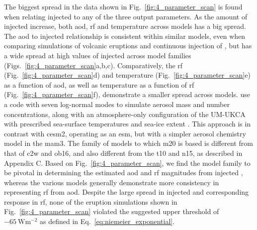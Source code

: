\documentclass{ametsocV6.1}
\newcommand{\iso}[1][i]{{#1}njected \ce{SO2}}
\begin{document}
The biggest spread in the data shown in Fig.~\ref{fig:4_parameter_scan} is found when
relating \iso{} to any of the three output parameters. As the amount of \iso{} increase,
both \gls{aod}, \gls{rf} and temperature across models has a big spread. The \gls{aod}
to \iso{} relationship is consistent within similar models, even when comparing
simulations of volcanic eruptions \citep{timmreck2010} and continuous injection of
 \citep{niemeier2015}, but has a wide spread at high values of \iso{} across
model families (Figs.~\ref{fig:4_parameter_scan}a,b,c). Comparatively, the \gls{rf}
(Fig.~\ref{fig:4_parameter_scan}d) and temperature (Fig.~\ref{fig:4_parameter_scan}e) as
a function of \gls{aod}, as well as temperature as a function of \gls{rf}
(Fig.~\ref{fig:4_parameter_scan}f), demonstrate a smaller spread across models.
\citet{marshall2019, marshall2020, marshall2021} use a code with seven log-normal modes
to simulate aerosol mass and number concentrations, along with an atmosphere-only
configuration of the UM-UKCA with prescribed sea-surface temperatures and sea-ice extent
\citep{marshall2019}. This approach is in contrast with \gls{cesm2}, operating as an
\gls{esm}, but with a simpler aerosol chemistry model in the \gls{mam3}. The family of
models to which \gls{m20} is based is different from that of \gls{c2w} and \gls{ob16},
and also different from the \gls{t10} and \gls{n15}, as described in Appendix C. Based
on Fig.~\ref{fig:4_parameter_scan}, we find the model family to be pivotal in
determining the estimated \gls{aod} and \gls{rf} magnitudes from \iso{}, whereas the
various models generally demonstrate more consistency in representing \gls{rf} from
\gls{aod}. Despite the large spread in \iso{} and corresponding response in \gls{rf},
none of the eruption simulations shown in Fig.~\ref{fig:4_parameter_scan} violated the
suggested upper threshold of \(\SI{-65}{\watt\metre^{-2}}\) as defined in
Eq.~\ref{eq:niemeier_exponential}.
\end{document}
